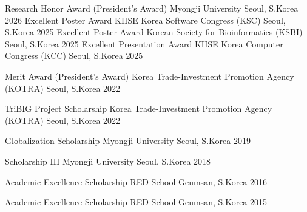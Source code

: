 \documentclass[11pt, a4paper]{awesome-cv}
\let\origcvsubsection\cvsubsection
\renewcommand{\cvsubsection}[1]{\needspace{5\baselineskip}\origcvsubsection{#1}}
\begin{document}

\begin{cvhonors}

  \cvhonor
    {Research Honor Award (President's Award)}
    {Myongji University}
    {Seoul, S.Korea}
    {2026}
  \cvhonor
    {Excellent Poster Award}
    {KIISE Korea Software Congress (KSC)}
    {Seoul, S.Korea}
    {2025}
  \cvhonor
    {Excellent Poster Award}
    {Korean Society for Bioinformatics (KSBI)}
    {Seoul, S.Korea}
    {2025}
  \cvhonor
    {Excellent Presentation Award}
    {KIISE Korea Computer Congress (KCC)}
    {Seoul, S.Korea}
    {2025}

  \cvhonor
    {Merit Award (President's Award)}
    {Korea Trade-Investment Promotion Agency (KOTRA)}
    {Seoul, S.Korea}
    {2022}

\end{cvhonors}





\begin{cvhonors}

\cvhonor
    {TriBIG Project Scholarship}
    {Korea Trade-Investment Promotion Agency (KOTRA)}
    {Seoul, S.Korea}
    {2022}

  \cvhonor
    {Globalization Scholarship}
    {Myongji University}
    {Seoul, S.Korea}
    {2019}

  \cvhonor
    {Scholarship III}
    {Myongji University}
    {Seoul, S.Korea}
    {2018}

\cvhonor
    {Academic Excellence Scholarship}
    {RED School}
    {Geumsan, S.Korea}
    {2016}

\cvhonor
    {Academic Excellence Scholarship}
    {RED School}
    {Geumsan, S.Korea}
    {2015}


\end{cvhonors}
\end{document}
